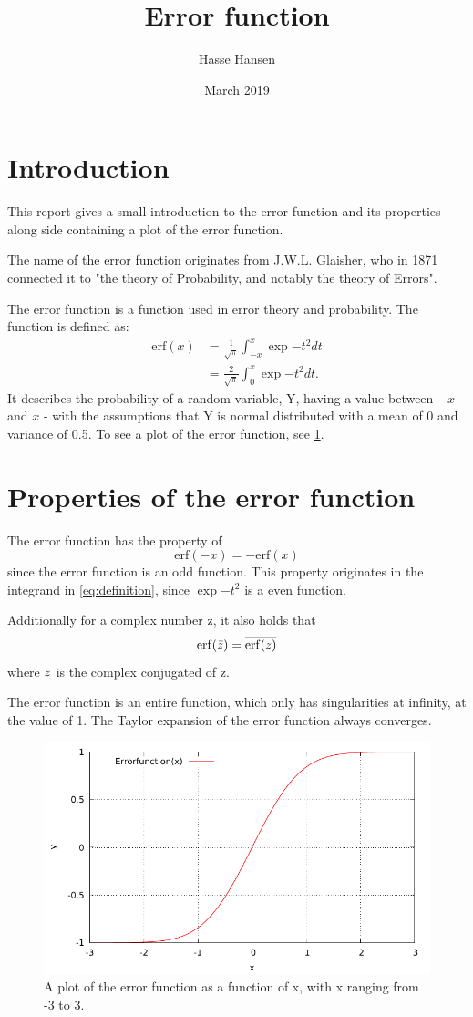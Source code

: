\documentclass[]{article}
\title{Error function}
\author{Hasse Hansen}
\date{March 2019}
\begin{document}
\maketitle

 
\section{Introduction}
This report gives a small introduction to the error function and its properties along side containing a plot of the error function. 

The name of the error function originates from J.W.L. Glaisher, who in 1871 connected it to "the theory of Probability, and notably the theory of Errors".

The error function is a function used in error theory and probability. The function is defined as: 
\begin{align}
    \mathrm{erf}(x) &= \frac{1}{\sqrt{\pi}} \int_{-x}^x \exp{-t^2} dt  \nonumber\\
    &=  \frac{2}{\sqrt{\pi}} \int_{0}^x \exp{-t^2} dt.
    \label{eq:definition}
\end{align}
It describes the probability of a random variable, Y, having a value between $-x$ and $x$ - with the assumptions that Y is normal distributed with a mean of 0 and variance of 0.5. To see a plot of the error function, see \cref{fig:Error}.

\section{Properties of the error function}
The error function has the property of 
\begin{equation}
    \mathrm{erf}(-x) = -\mathrm{erf}(x)
\end{equation}
since the error function is an odd function. This property originates in the integrand in \cref{eq:definition}, since $\exp{-t^2}$ is a even function.

Additionally for a complex number z, it also holds that
\begin{equation}
    \mathrm{erf}(\Bar{z}) = \overline{\mathrm{erf}(z)}
\end{equation}
where $\Bar{z}$ is the complex conjugated of z.

The error function is an entire function, which only has singularities at infinity, at the value of 1. The Taylor expansion of the error function always converges.

\begin{figure}
    \centering
    \includegraphics{Error_plot.pdf}
    \caption{A plot of the error function as a function of x, with x ranging from -3 to 3. }
    \label{fig:Error}
\end{figure}
\end{document}
